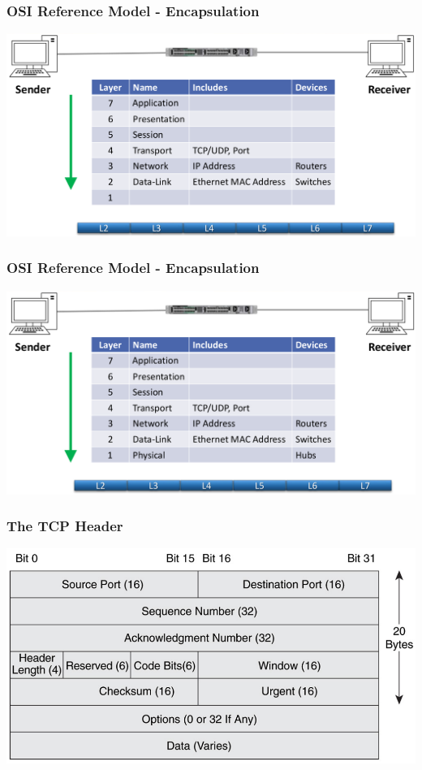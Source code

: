\documentclass[pdflatex,compress]{beamer}
\begin{document}
\begin{frame}
	\frametitle{OSI Reference Model - Encapsulation}
	\begin{center}
		\includegraphics[width=\linewidth]{img/img10}
	\end{center}
\end{frame}

\begin{frame}
	\frametitle{OSI Reference Model - Encapsulation}
	\begin{center}
		\includegraphics[width=\linewidth]{img/img11}
	\end{center}
\end{frame}

\begin{frame}
	\frametitle{The TCP Header}
	\begin{center}
		\includegraphics[width=\linewidth]{img/img12}
	\end{center}
\end{frame}
\end{document}
